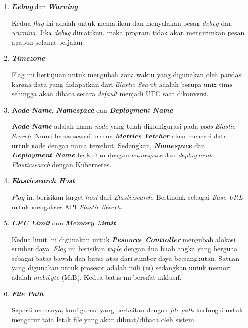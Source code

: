 \begin{enumerate}
    \item \textbf{\textit{Debug}} dan \textbf{\textit{Warning}}
    
    Kedua \textit{flag} ini adalah untuk mematikan dan menyalakan pesan \textit{debug} dan \textit{warning}. Jika \textit{debug} dimatikan, maka program tidak akan mengirimkan pesan apapun selama berjalan.

    \item \textbf{\textit{Timezone}}
    
    Flag ini bertujuan untuk mengubah zona waktu yang digunakan oleh pandas karena data yang didapatkan dari \textit{Elastic Search} adalah berupa unix time sehingga akan dibaca secara \textit{default} menjadi UTC saat dikonversi.

    \item \textbf{\textit{Node Name}}, \textbf{\textit{Namespace}} dan \textbf{\textit{Deployment Name}}
    
    \textbf{\textit{Node Name}} adalah nama \textit{node} yang telah dikonfigurasi pada \textit{pods Elastic Search}. Nama harus sesuai karena \textbf{\textit{Metrics Fetcher}} akan mencari data untuk node dengan nama tersebut. Sedangkan, \textbf{\textit{Namespace}} dan \textbf{\textit{Deployment Name}} berkaitan dengan \textit{namespace} dan \textit{deployment Elasticsearch} dengan Kubernetes.

    \item \textbf{\textit{Elasticsearch Host}}
    
    \textit{Flag} ini berisikan target \textit{host} dari \textit{Elasticsearch}. Bertindak sebagai \textit{Base URL} untuk mengakses API \textit{Elastic Search}.

    \item \textbf{\textit{CPU Limit}} dan \textbf{\textit{Memory Limit}}
    
    Kedua limit ini digunakan untuk \textbf{\textit{Resource Controller}} mengubah alokasi sumber daya. \textit{Flag} ini berisikan \textit{tuple} dengan dua buah angka yang berguna sebagai batas bawah dan batas atas dari sumber daya bersangkutan. Satuan yang digunakan untuk prosesor adalah mili (m) sedangkan untuk memori adalah \textit{mebibyte} (MiB). Kedua batas ini bersifat inklusif.

    \item \textbf{\textit{File Path}}
    
    Seperti namanya, konfigurasi yang berkaitan dengan \textit{file path} berfungsi untuk mengatur tata letak file yang akan dibuat/dibaca oleh sistem.


\end{enumerate}
